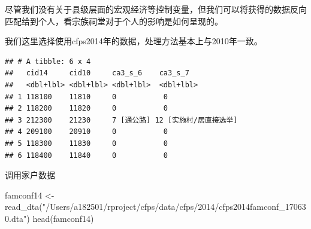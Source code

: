 \documentclass[
  oneside]{book}
\newenvironment{Shaded}{\begin{snugshade}}{\end{snugshade}}
\newcommand{\CommentTok}[1]{\textcolor[rgb]{0.56,0.35,0.01}{\textit{#1}}}
\newcommand{\DecValTok}[1]{\textcolor[rgb]{0.00,0.00,0.81}{#1}}
\newcommand{\FunctionTok}[1]{\textcolor[rgb]{0.00,0.00,0.00}{#1}}
\newcommand{\NormalTok}[1]{#1}
\newcommand{\OtherTok}[1]{\textcolor[rgb]{0.56,0.35,0.01}{#1}}
\newcommand{\SpecialCharTok}[1]{\textcolor[rgb]{0.00,0.00,0.00}{#1}}
\newcommand{\StringTok}[1]{\textcolor[rgb]{0.31,0.60,0.02}{#1}}
\begin{document}
尽管我们没有关于县级层面的宏观经济等控制变量，但我们可以将获得的数据反向匹配给到个人，看宗族祠堂对于个人的影响是如何呈现的。

我们这里选择使用cfps2014年的数据，处理方法基本上与2010年一致。

\begin{Shaded}
\end{Shaded}

\begin{verbatim}
## # A tibble: 6 x 4
##   cid14     cid10     ca3_s_6    ca3_s_7               
##   <dbl+lbl> <dbl+lbl> <dbl+lbl>  <dbl+lbl>             
## 1 118100    11810     0           0                    
## 2 118200    11820     0           0                    
## 3 212300    21230     7 [通公路] 12 [实施村/居直接选举]
## 4 209100    20910     0           0                    
## 5 118300    11830     0           0                    
## 6 118400    11840     0           0
\end{verbatim}

调用家户数据

\begin{Shaded}
\begin{Highlighting}[]
\NormalTok{famconf14 }\OtherTok{\textless{}{-}} \FunctionTok{read\_dta}\NormalTok{(}\StringTok{"/Users/a182501/rproject/cfps/data/cfps/2014/cfps2014famconf\_170630.dta"}\NormalTok{)}
\FunctionTok{head}\NormalTok{(famconf14)}
\end{Highlighting}
\end{Shaded}
\end{document}
